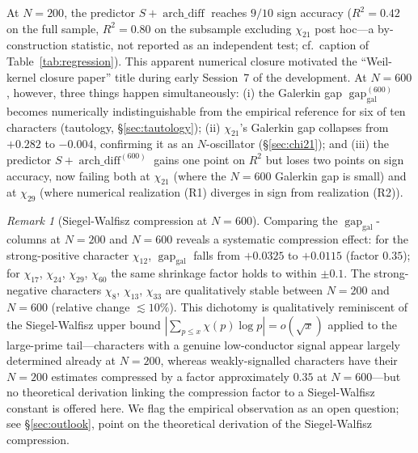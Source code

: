 \documentclass[10pt,twocolumn]{article}
\theoremstyle{definition}
\theoremstyle{remark}
\newtheorem{remark}[theorem]{Remark}
\newcommand{\gap}{\operatorname{gap}}
\newcommand{\chifn}{\chi}
\newcommand{\archdiff}{\operatorname{arch\_diff}}
\begin{document}
At $N=200$, the predictor $S+\archdiff$ reaches $9/10$ sign accuracy
($R^2=0.42$ on the full sample, $R^2=0.80$ on the subsample
excluding $\chifn_{21}$ post hoc---a by-construction statistic, not
reported as an independent test; cf.\ caption of
Table~\ref{tab:regression}). This apparent numerical closure
motivated the ``Weil-kernel closure paper'' title during early
Session~7 of the development. At $N=600$, however, three things
happen simultaneously:
(i) the Galerkin gap $\gap_{\mathrm{gal}}^{(600)}$ becomes
numerically indistinguishable from the empirical reference for six
of ten characters (tautology, \S\ref{sec:tautology});
(ii) $\chifn_{21}$'s Galerkin gap collapses from $+0.282$ to
$-0.004$, confirming it as an $N$-oscillator
(\S\ref{sec:chi21}); and
(iii) the predictor $S+\archdiff^{(600)}$ gains one point on
$R^2$ but loses two points on sign accuracy, now failing both at
$\chifn_{21}$ (where the $N=600$ Galerkin gap is small) and at
$\chifn_{29}$ (where numerical realization (R1) diverges in sign
from realization (R2)).

\begin{remark}[Siegel-Walfisz compression at $N=600$]
\label{rem:sw-compression}
Comparing the $\gap_{\mathrm{gal}}$-columns at $N=200$ and $N=600$
reveals a systematic compression effect: for the strong-positive
character $\chifn_{12}$, $\gap_{\mathrm{gal}}$ falls from
$+0.0325$ to $+0.0115$ (factor $0.35$); for $\chifn_{17}$,
$\chifn_{24}$, $\chifn_{29}$, $\chifn_{60}$ the same
shrinkage factor holds to within $\pm 0.1$. The strong-negative
characters $\chifn_8$, $\chifn_{13}$, $\chifn_{33}$ are
qualitatively stable between $N=200$ and $N=600$ (relative change
$\lesssim 10\%$). This dichotomy is qualitatively reminiscent of the
Siegel-Walfisz upper bound $|\sum_{p\leq x}\chifn(p)\log p|
=o(\sqrt{x})$ applied to the large-prime tail---characters with a
genuine low-conductor signal appear largely determined already at
$N=200$, whereas weakly-signalled characters have their $N=200$
estimates compressed by a factor approximately $0.35$ at $N=600$---but
no theoretical derivation linking the compression factor to a
Siegel-Walfisz constant is offered here. We flag the empirical
observation as an open question; see \S\ref{sec:outlook}, point on
the theoretical derivation of the Siegel-Walfisz compression.
\end{remark}
\end{document}
